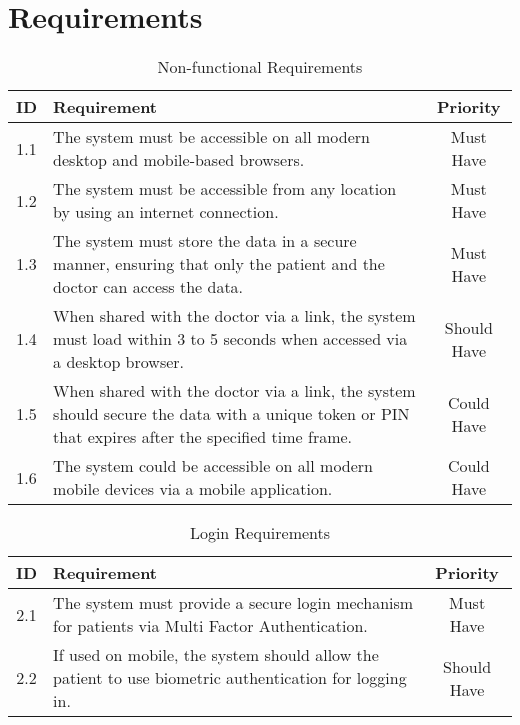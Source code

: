 \appendix

\chapter{Requirements}
\label{sec:requirements}

\begin{table}[h!]
    \centering
    \begin{tabular}{|c|p{10cm}|c|}
    \hline
    \textbf{ID}  & \textbf{Requirement}  & \textbf{Priority} \\ \hline
    1.1  & The system must be accessible on all modern desktop and mobile-based browsers.       & Must Have \\ \hline
    1.2  & The system must be accessible from any location by using an internet connection.     & Must Have \\ \hline
    1.3  & The system must store the data in a secure manner, ensuring that only the patient and the doctor can access the data. & Must Have \\ \hline
    1.4  & When shared with the doctor via a link, the system must load within 3 to 5 seconds when accessed via a desktop browser. & Should Have \\ \hline
    1.5  & When shared with the doctor via a link, the system should secure the data with a unique token or PIN that expires after the specified time frame. & Could Have \\ \hline
    1.6  & The system could be accessible on all modern mobile devices via a mobile application. & Could Have \\ \hline
    \end{tabular}
    \caption{Non-functional Requirements}
\end{table}
    
\begin{table}[h!]
    \centering
    \begin{tabular}{|c|p{10cm}|c|}
    \hline
    \textbf{ID}  & \textbf{Requirement}  & \textbf{Priority} \\ \hline
    2.1  & The system must provide a secure login mechanism for patients via Multi Factor Authentication. & Must Have \\ \hline
    2.2  & If used on mobile, the system should allow the patient to use biometric authentication for logging in. & Should Have \\ \hline
    \end{tabular}
    \caption{Login Requirements}
\end{table}

